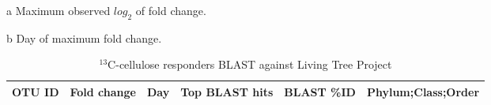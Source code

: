 \thispagestyle{empty}

\begin{ThreePartTable}
\begin{TableNotes}
\item[a] Maximum observed $log_{2}$ of fold change. 
\item[b] Day of maximum fold change.
\end{TableNotes}

\begin{longtable}{lrrP{5cm}rP{5cm}}

\caption{$^{13}$C-cellulose responders BLAST against Living Tree Project}\label{tab:cell} \\
\toprule 
    \textbf{OTU ID} & 
    \textbf{Fold change}  & 
    \textbf{Day}  & 
    \textbf{Top BLAST hits} & 
    \textbf{BLAST \%ID} & 
    \textbf{Phylum;Class;Order} \\
\midrule
\endfirsthead


\end{longtable}
\end{ThreePartTable}
